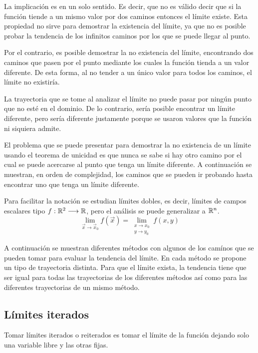 \documentclass[a5paper,12pt,twoside]{book}
\begin{document}
La implicación es en un solo sentido.
Es decir, que no es válido decir que si la función tiende a un mismo valor por dos caminos entonces el límite existe.
Esta propiedad no sirve para demostrar la existencia del límite, ya que no es posible probar la tendencia de los infinitos caminos por los que se puede llegar al punto.

Por el contrario, es posible demostrar la no existencia del límite, encontrando dos caminos que pasen por el punto mediante los cuales la función tienda a un valor diferente.
De esta forma, al no tender a un único valor para todos los caminos, el límite no existiría.

La trayectoria que se tome al analizar el límite no puede pasar por ningún punto que no esté en el dominio.
De lo contrario, sería posible encontrar un límite diferente, pero sería diferente justamente porque se usaron valores que la función ni siquiera admite.

El problema que se puede presentar para demostrar la no existencia de un límite usando el teorema de unicidad es que nunca se sabe si hay otro camino por el cual se puede acercarse al punto que tenga un límite diferente.
A continuación se muestran, en orden de complejidad, los caminos que se pueden ir probando hasta encontrar uno que tenga un límite diferente.

Para facilitar la notación se estudian límites dobles, es decir, límites de campos escalares tipo $f:\mathbb{R}^2 \longrightarrow \mathbb{R}$, pero el análisis se puede generalizar a $\mathbb{R}^n$.
\begin{equation*}
    \lim_{\Vec{x} \to \Vec{x}_0} f(\Vec{x}) = \lim_{\substack{x \to x_0\\y \to y_0}} f(x,y)
\end{equation*}

A continuación se muestran diferentes métodos con algunos de los camínos que se pueden tomar para evaluar la tendencia del límite.
En cada método se propone un tipo de trayectoria distinta.
Para que el límite exista, la tendencia tiene que ser igual para todas las trayectorias de los diferentes métodos así como para las diferentes trayectorias de un mismo método.


\subsection{Límites iterados}

Tomar límites iterados o reiterados es tomar el límite de la función dejando solo una variable libre y las otras fijas.
\end{document}
